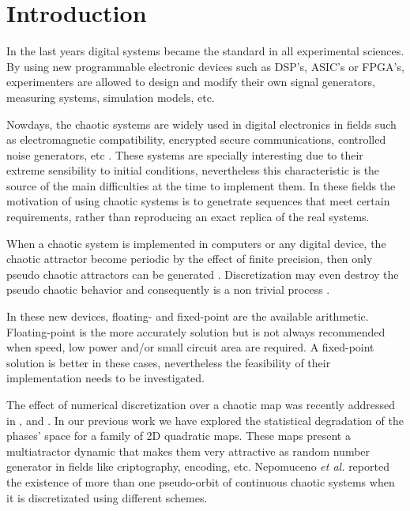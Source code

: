 \section{Introduction} \label{sec:intro}

In the last years digital systems became the standard in all experimental sciences.
By using new programmable electronic devices such as DSP's, ASIC's or FPGA's, experimenters are allowed to design and modify their own signal generators, measuring systems, simulation models, etc.

Nowdays, the chaotic systems are widely used in digital electronics in fields such as electromagnetic compatibility, encrypted secure communications, controlled noise generators, etc \cite{Machado2004,Smaoui2009,DeMicco2017,Antonelli2012,DeMicco2007A,DeMicco2007B}.
These systems are specially interesting due to their extreme sensibility to initial conditions, nevertheless this characteristic is the source of the main difficulties at the time to implement them.  
In these fields the motivation of using chaotic systems is to genetrate sequences that meet certain requirements, rather than reproducing an exact replica of the real systems.

When a chaotic system is implemented in computers or any digital device, the chaotic attractor become periodic by the effect of finite precision, then only pseudo chaotic attractors can be generated \cite{Alcover2017,Dias2011}.
Discretization may even destroy the pseudo chaotic behavior and consequently is a non trivial process \cite{DeMicco2017,Azzaz2013}.

In these new devices, floating- and fixed-point are the available arithmetic.
Floating-point is the more accurately solution but is not always recommended when speed, low power and/or small circuit area are required.
A fixed-point solution is better in these cases, nevertheless the feasibility of their implementation needs to be investigated.

The effect of numerical discretization over a chaotic map was recently addressed in \cite{Alcover2017}, \cite{DeMicco2017} and \cite{Nepomuceno2017}.
In our previous work \cite{DeMicco2017} we have explored the statistical degradation of the phases' space for a family of 2D quadratic maps.
These maps present a multiatractor dynamic that makes them very attractive as random number generator in fields like criptography, encoding, etc.
Nepomuceno \textit{et al.} \cite{Nepomuceno2017} reported the existence of more than one pseudo-orbit of continuous chaotic systems when it is discretizated using different schemes.

